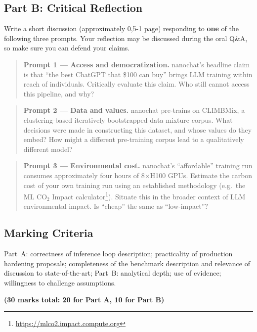 \subsection{Part B: Critical Reflection}

Write a short discussion (approximately 0,5-1 page) responding to \textbf{one} of the following three prompts. Your reflection may be discussed during the oral Q\&A, so make sure you can defend your claims.

\begin{quote}
\textbf{Prompt 1 --- Access and democratization.}
nanochat's headline claim is that ``the best ChatGPT that \$100 can buy'' brings LLM training within reach of individuals. Critically evaluate this claim. Who still cannot access this pipeline, and why?
\end{quote}

\begin{quote}
\textbf{Prompt 2 --- Data and values.}
nanochat pre-trains on CLIMBMix, a clustering-based iteratively bootstrapped data mixture corpus. What decisions were made in constructing this dataset, and whose values do they embed?  How might a different pre-training corpus lead to a qualitatively different model?
\end{quote}

\begin{quote}
\textbf{Prompt 3 --- Environmental cost.}
nanochat's ``affordable'' training run consumes approximately four hours of 8$\times$H100 GPUs. Estimate the carbon cost of your own training run using an established methodology (e.g.\ the ML CO$_2$ Impact calculator\footnote{\url{https://mlco2.impact.compute.org}}). Situate this in the broader context of LLM environmental impact.  Is ``cheap'' the same as ``low-impact''?
\end{quote}

\subsection{Marking Criteria}

Part~A: correctness of inference loop description; practicality of production hardening proposals; completeness of the benchmark description and relevance of discussion to state-of-the-art; Part~B: analytical depth; use of evidence; willingness to challenge assumptions.

\noindent\textbf{(30 marks total: 20 for Part A, 10 for Part B)}

